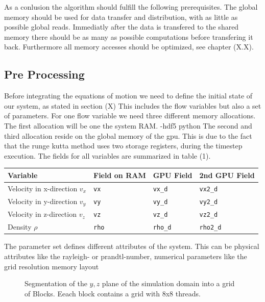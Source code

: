 As a conlusion the algorithm should fulfill the following prerequisites.
The global memory should be used for data transfer and distribution, with as little as possible global reads.
Immediatly after the data is transfered to the shared memory there should be as many as possible computations before transfering
it back. Furthermore all memory accesses should be optimized, see chapter (X.X).

\subsection{Pre Processing}

\label{cuda:prepro}
Before integrating the equations of motion we need to define the initial state of our system, as stated in section (X)
This includes the flow variables but also a set of parameters.
For one flow variable we need three different memory allocations.
The first allocation will be one the system RAM.
-hdf5 python
The second and third allocation reside on the global memory of the gpu.
This is due to the fact that the runge kutta method uses two storage registers, during the timestep execution.
The fields for all variables are summarized in table (1).

\begin{center}
    \begin{tabular}{ | l | l | l | l |}
    \hline
    Variable & Field on RAM & GPU Field & 2nd GPU Field \\
    \hline
    Velocity in x-direction $v_x$  & \texttt{vx}   &  \texttt{vx\_d}   & \texttt{vx2\_d}   \\
    Velocity in y-direction $v_y$  & \texttt{vy}   &  \texttt{vy\_d}   & \texttt{vy2\_d}   \\
    Velocity in z-direction $v_z$  & \texttt{vz}   &  \texttt{vz\_d}   & \texttt{vz2\_d}   \\
    Density  $\rho$  & \texttt{rho}  &  \texttt{rho\_d}  & \texttt{rho2\_d}  \\
    \hline
    \end{tabular}
\end{center}
The parameter set defines different attributes of the system.
This can be physical attributes like the rayleigh- or prandtl-number, numerical parameters like the grid resolution
memory layout

\clearpage


\begin{figure}[!bp]
      \centering
       \caption{Segmentation of the $y, z$ plane of the simulation domain into a grid of Blocks.
                 Eeach block contains a grid with 8x8 threads.}
       \label{cuda:stencil}
\end{figure}

